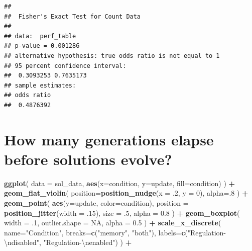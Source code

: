 \documentclass[
]{book}
\newenvironment{Shaded}{\begin{snugshade}}{\end{snugshade}}
\newcommand{\CharTok}[1]{\textcolor[rgb]{0.31,0.60,0.02}{#1}}
\newcommand{\DataTypeTok}[1]{\textcolor[rgb]{0.13,0.29,0.53}{#1}}
\newcommand{\DecValTok}[1]{\textcolor[rgb]{0.00,0.00,0.81}{#1}}
\newcommand{\FloatTok}[1]{\textcolor[rgb]{0.00,0.00,0.81}{#1}}
\newcommand{\KeywordTok}[1]{\textcolor[rgb]{0.13,0.29,0.53}{\textbf{#1}}}
\newcommand{\NormalTok}[1]{#1}
\newcommand{\OperatorTok}[1]{\textcolor[rgb]{0.81,0.36,0.00}{\textbf{#1}}}
\newcommand{\OtherTok}[1]{\textcolor[rgb]{0.56,0.35,0.01}{#1}}
\newcommand{\StringTok}[1]{\textcolor[rgb]{0.31,0.60,0.02}{#1}}
\begin{document}
\begin{verbatim}
## 
##  Fisher's Exact Test for Count Data
## 
## data:  perf_table
## p-value = 0.001286
## alternative hypothesis: true odds ratio is not equal to 1
## 95 percent confidence interval:
##  0.3093253 0.7635173
## sample estimates:
## odds ratio 
##  0.4876392
\end{verbatim}

\hypertarget{how-many-generations-elapse-before-solutions-evolve-3}{%
\section{How many generations elapse before solutions evolve?}\label{how-many-generations-elapse-before-solutions-evolve-3}}

\begin{Shaded}
\begin{Highlighting}[]
\KeywordTok{ggplot}\NormalTok{( }\DataTypeTok{data =}\NormalTok{ sol\_data, }\KeywordTok{aes}\NormalTok{(}\DataTypeTok{x=}\NormalTok{condition, }\DataTypeTok{y=}\NormalTok{update, }\DataTypeTok{fill=}\NormalTok{condition) ) }\OperatorTok{+}
\StringTok{  }\KeywordTok{geom\_flat\_violin}\NormalTok{(}
    \DataTypeTok{position=}\KeywordTok{position\_nudge}\NormalTok{(}\DataTypeTok{x =} \FloatTok{.2}\NormalTok{, }\DataTypeTok{y =} \DecValTok{0}\NormalTok{),}
    \DataTypeTok{alpha=}\NormalTok{.}\DecValTok{8}
\NormalTok{  ) }\OperatorTok{+}
\StringTok{  }\KeywordTok{geom\_point}\NormalTok{(}
    \KeywordTok{aes}\NormalTok{(}\DataTypeTok{y=}\NormalTok{update, }\DataTypeTok{color=}\NormalTok{condition),}
    \DataTypeTok{position =} \KeywordTok{position\_jitter}\NormalTok{(}\DataTypeTok{width =} \FloatTok{.15}\NormalTok{),}
    \DataTypeTok{size =} \FloatTok{.5}\NormalTok{,}
    \DataTypeTok{alpha =} \FloatTok{0.8}
\NormalTok{  ) }\OperatorTok{+}
\StringTok{  }\KeywordTok{geom\_boxplot}\NormalTok{(}
    \DataTypeTok{width =} \FloatTok{.1}\NormalTok{,}
    \DataTypeTok{outlier.shape =} \OtherTok{NA}\NormalTok{,}
    \DataTypeTok{alpha =} \FloatTok{0.5}
\NormalTok{  ) }\OperatorTok{+}
\StringTok{  }\KeywordTok{scale\_x\_discrete}\NormalTok{(}
    \DataTypeTok{name=}\StringTok{"Condition"}\NormalTok{,}
    \DataTypeTok{breaks=}\KeywordTok{c}\NormalTok{(}\StringTok{"memory"}\NormalTok{, }\StringTok{"both"}\NormalTok{),}
    \DataTypeTok{labels=}\KeywordTok{c}\NormalTok{(}\StringTok{"Regulation{-}}\CharTok{\textbackslash{}n}\StringTok{disabled"}\NormalTok{, }\StringTok{"Regulation{-}}\CharTok{\textbackslash{}n}\StringTok{enabled"}\NormalTok{)}
\NormalTok{  ) }\OperatorTok{+}

\end{Highlighting}
\end{Shaded}
\end{document}
